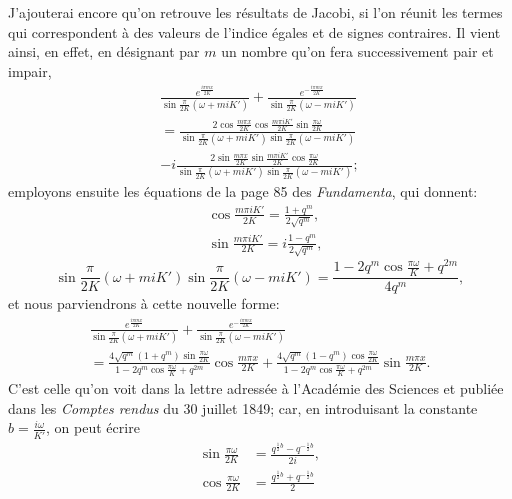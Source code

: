 \documentclass[11pt,leqno,oneside,letterpaper]{book}[2005/09/16]
\begin{document}
J'ajouterai encore qu'on retrouve les r\'esultats de Jacobi, si l'on r\'eunit
les termes qui correspondent \`a des valeurs de l'indice \'egales et de signes
contraires. Il vient ainsi, en effet, en d\'esignant par $m$ un nombre qu'on
fera successivement pair et impair,
\begin{multline*}
  \frac{ e^{ \frac{i\pi m x}{2K}} }{ \sin\frac{\pi}{2K}(\omega+m i K') }
+ \frac{ e^{-\frac{i\pi m x}{2K}} }{ \sin\frac{\pi}{2K}(\omega-m i K') }
\\
=
  \frac{ 2\cos\frac{m\pi x}{2K}
    \cos\frac{m\pi iK'}{2K}
    \sin\frac{\pi\omega}{2K} }{ \sin\frac{\pi}{2K}(\omega+m i K')
    \sin\frac{\pi}{2K}(\omega-m i K')} \\
- i
  \frac{ 2\sin\frac{m\pi x}{2K}
    \sin\frac{m\pi iK'}{2K}
    \cos\frac{\pi\omega}{2K} }{ \sin\frac{\pi}{2K}(\omega+m i K')
    \sin\frac{\pi}{2K}(\omega-m i K')};
\end{multline*}
employons ensuite les \'equations de la page 85 des \textit{Fundamenta}, qui donnent:
\begin{align*}
  &\cos\frac{m\pi iK'}{2K} =  \frac{1+q^m}{2\sqrt{q^m}},\\
  &\sin\frac{m\pi iK'}{2K} = i\frac{1-q^m}{2\sqrt{q^m}},
\end{align*}\[
  \sin\frac{\pi}{2K}(\omega+m i K')
  \sin\frac{\pi}{2K}(\omega-m i K')
= \frac{1-2q^m\cos\frac{\pi\omega}{K}+q^{2m}}{4q^m},
\]
et nous parviendrons \`a cette nouvelle forme:
\begin{multline*}
  \frac{ e^{ \frac{i\pi m x}{2K}} }{ \sin\frac{\pi}{2K}(\omega+m i K')}
+ \frac{ e^{-\frac{i\pi m x}{2K}} }{ \sin\frac{\pi}{2K}(\omega-m i K') }
\\[1ex]
 =
  \frac{ 4\sqrt{q^m}(1+q^m) \sin\frac{\pi\omega}{2K} }{ 1-2q^m\cos\frac{\pi\omega}{K} + q^{2m} }
  \cos\frac{m\pi x}{2K}
+
  \frac{ 4\sqrt{q^m}(1-q^m) \cos\frac{\pi\omega}{2K} }{
         1-2q^m\cos\frac{\pi\omega}{K} + q^{2m} }
  \sin\frac{m\pi x}{2K} .
\end{multline*}
C'est celle qu'on voit dans la lettre adress\'ee \`a l'Acad\'emie des Sciences et
publi\'ee dans les \textit{Comptes rendus} du 30 juillet 1849; car, en introduisant la
constante $b=\frac{i\omega}{K'}$, on peut \'ecrire
\begin{align*}
  \sin\frac{\pi\omega}{2K}
&= \frac{q^{\frac{1}{2}b} - q^{-\frac{1}{2}b} }{2i},
\\
  \cos\frac{\pi\omega}{2K}
&= \frac{q^{\frac{1}{2}b} + q^{-\frac{1}{2}b} }{2}
\end{align*}
\end{document}
